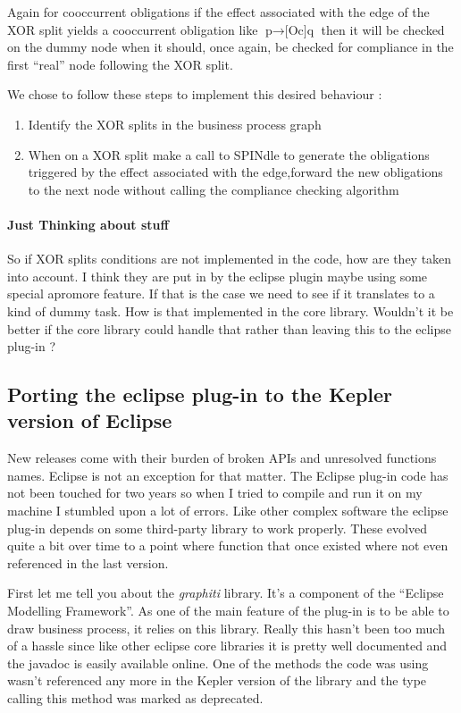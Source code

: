 \documentclass[10pt]{report}
\begin{document}
Again for cooccurrent obligations if the effect associated with the edge of the XOR split yields a cooccurrent obligation like $\text{p} \rightarrow \text{[Oc]q}$ then it will be checked on the dummy node when it should, once again, be checked for compliance in the first \enquote{real} node following the XOR split.

We chose to follow these steps to implement this desired behaviour :
\begin{enumerate}
\item Identify the XOR splits in the business process graph
\item When on a XOR split make a call to SPINdle to generate the obligations triggered by the effect associated with the edge,forward the new obligations to the next node without calling the compliance checking algorithm
\end{enumerate}

\paragraph{Just Thinking about stuff} 
So if XOR splits conditions are not implemented in the code, how are they taken into account. I think they are put in by the eclipse plugin maybe using some special apromore feature. If that is the case we need to see if it translates to a kind of dummy task. How is that implemented in the core library. Wouldn't it be better if the core library could handle that rather than leaving this to the eclipse plug-in ?


\subsection{Porting the eclipse plug-in to the Kepler version of Eclipse}

New releases come with their burden of broken APIs and unresolved functions names. Eclipse is not an exception for that matter. The Eclipse plug-in code has not been touched for two years so when I tried to compile and run it on my machine I stumbled upon a lot of errors. Like other complex software the eclipse plug-in depends on some third-party library to work properly. These evolved quite a bit over time to a point where function that once existed where not even referenced in the last version.

First let me tell you about the \textit{graphiti} library. It's a component of the \enquote{Eclipse Modelling Framework}. As one of the main feature of the plug-in is to be able to draw business process, it relies on this library. Really this hasn't been too much of a hassle since like other eclipse core libraries it is pretty well documented and the javadoc is easily available online. One of the methods the code was using wasn't referenced any more in the Kepler version of the library and the type calling this method was marked as deprecated. 
\end{document}
